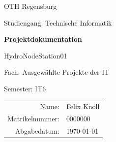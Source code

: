 \begin{titlepage}
    \centering
    \vspace*{2cm}

    {\Large OTH Regensburg\par}
    \vspace{0.8cm}
    {\large Studiengang: Technische Informatik\par}

    \vspace{2.5cm}
    {\Huge\bfseries Projektdokumentation\par}
    \vspace{0.6cm}
    {\LARGE HydroNodeStation01\par}

    \vspace{1.5cm}
    {\large Fach: Ausgewählte Projekte der IT\par}
    \vspace{0.3cm}
    {\large Semester: IT6\par}

    \vfill

    \begin{tabular}{rl}
        Name: & Felix Knoll \\
        Matrikelnummer: & 0000000 \\
        Abgabedatum: & \today
    \end{tabular}
\end{titlepage}
